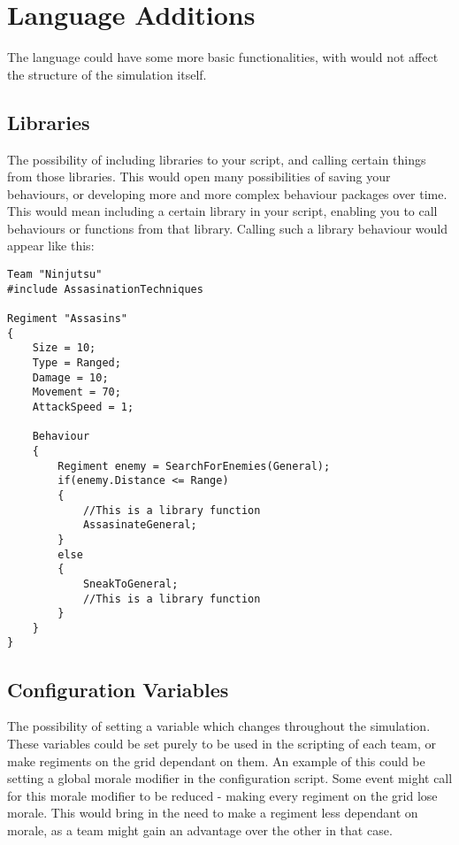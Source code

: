 \section{Language Additions}
The language could have some more basic functionalities, with would not affect the structure of the simulation itself.
\subsection{Libraries}
The possibility of including libraries to your script, and calling certain things from those libraries. This would open many possibilities of saving your behaviours, or developing more and more complex behaviour packages over time. This would mean including a certain library in your script, enabling you to call behaviours or functions from that library. Calling such a library behaviour would appear like this:

\begin{lstlisting}
Team "Ninjutsu"
#include AssasinationTechniques

Regiment "Assasins"
{
	Size = 10;
	Type = Ranged;
	Damage = 10;
	Movement = 70;
	AttackSpeed = 1;
	
	Behaviour
	{
		Regiment enemy = SearchForEnemies(General);
		if(enemy.Distance <= Range)
		{
			//This is a library function
			AssasinateGeneral; 
		}
		else
		{
			SneakToGeneral;
			//This is a library function
		}
	}
}

\end{lstlisting}


\subsection{Configuration Variables}
The possibility of setting a variable which changes throughout the simulation. These variables could be set purely to be used in the scripting of each team, or make regiments on the grid dependant on them.
An example of this could be setting a global morale modifier in the configuration script. Some event might call for this morale modifier to be reduced - making every regiment on the grid lose morale. This would bring in the need to make a regiment less dependant on morale, as a team might gain an advantage over the other in that case.
